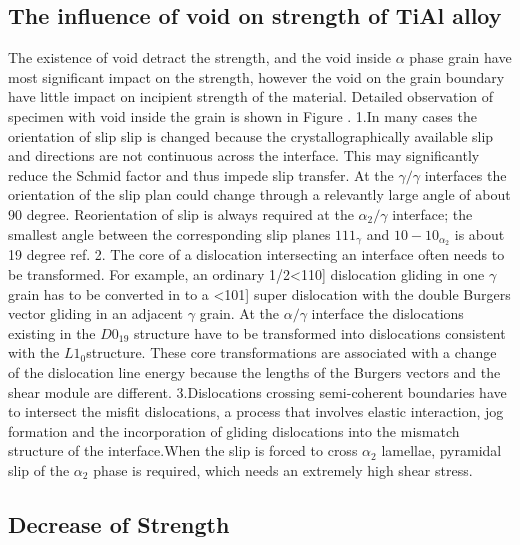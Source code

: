 \documentclass[final,5p,times,twocolumn]{elsarticle}
\begin{document}
\subsection{The influence of void on strength of TiAl alloy}
The existence of void detract the strength, and the void inside $\alpha$ phase grain have most significant  impact on the strength, however the void on the grain boundary have little impact on incipient strength of the material. Detailed observation of specimen with void inside the grain is shown in Figure \cite{}.
1.In many cases the orientation of slip slip is changed because the crystallographically available slip and directions are not continuous across the interface. This may significantly reduce the Schmid factor and thus impede slip transfer. At the $\gamma/\gamma$ interfaces the orientation of the slip plan could change through a relevantly large angle of about 90 degree. Reorientation of slip is always required at the $\alpha_{2} / \gamma$ interface; the smallest angle between the corresponding slip planes ${1 1 1 }_{\gamma}$ and ${ 1 0 -1 0}_{\alpha_2}$ is about 19 degree ref{}.
2. The core of  a dislocation intersecting an interface often needs to be transformed. For example, an ordinary 1/2<110] dislocation gliding in one $\gamma$ grain has to be converted in to a <101] super dislocation with the double Burgers vector gliding in an adjacent $\gamma$ grain. At the $\alpha/\gamma$ interface the dislocations existing in the $D0_{19}$ structure have to be transformed into dislocations consistent with the $L1_0$structure. These core transformations are associated with a change of the dislocation line energy because the lengths of the Burgers vectors and the shear module are different.
3.Dislocations crossing semi-coherent boundaries have to intersect the misfit dislocations, a process that involves elastic interaction, jog formation and the incorporation of gliding dislocations into the mismatch structure of the interface.When the slip is forced to cross $\alpha_2$ lamellae, pyramidal slip of the $\alpha_2$ phase is required, which needs an extremely high shear stress.

\subsection{Decrease of Strength}

%

\end{document}
